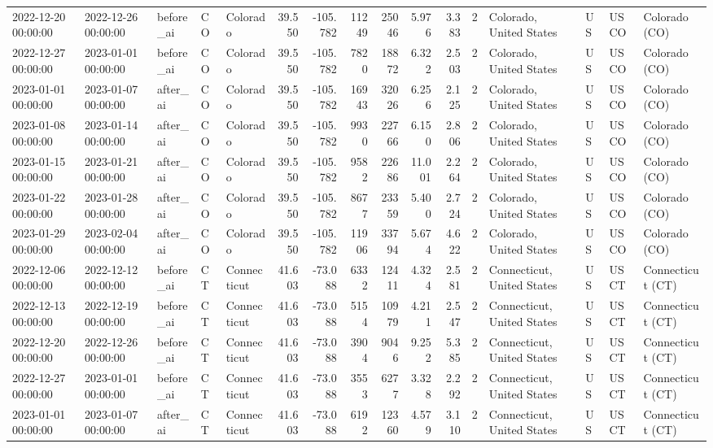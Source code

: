 \begin{tabular}{lllllrrrrrrlllll}
2022-12-20 00:00:00 & 2022-12-26 00:00:00 & before\_ai & CO & Colorado & 39.550 & -105.782 & 11249 & 25046 & 5.976 & 3.383 & 2 & Colorado, United States & US & USCO & Colorado (CO) \\
2022-12-27 00:00:00 & 2023-01-01 00:00:00 & before\_ai & CO & Colorado & 39.550 & -105.782 & 7820 & 18872 & 6.322 & 2.503 & 2 & Colorado, United States & US & USCO & Colorado (CO) \\
2023-01-01 00:00:00 & 2023-01-07 00:00:00 & after\_ai & CO & Colorado & 39.550 & -105.782 & 16943 & 32026 & 6.256 & 2.125 & 2 & Colorado, United States & US & USCO & Colorado (CO) \\
2023-01-08 00:00:00 & 2023-01-14 00:00:00 & after\_ai & CO & Colorado & 39.550 & -105.782 & 9930 & 22766 & 6.150 & 2.806 & 2 & Colorado, United States & US & USCO & Colorado (CO) \\
2023-01-15 00:00:00 & 2023-01-21 00:00:00 & after\_ai & CO & Colorado & 39.550 & -105.782 & 9582 & 22686 & 11.001 & 2.264 & 2 & Colorado, United States & US & USCO & Colorado (CO) \\
2023-01-22 00:00:00 & 2023-01-28 00:00:00 & after\_ai & CO & Colorado & 39.550 & -105.782 & 8677 & 23359 & 5.400 & 2.724 & 2 & Colorado, United States & US & USCO & Colorado (CO) \\
2023-01-29 00:00:00 & 2023-02-04 00:00:00 & after\_ai & CO & Colorado & 39.550 & -105.782 & 11906 & 33794 & 5.674 & 4.622 & 2 & Colorado, United States & US & USCO & Colorado (CO) \\
2022-12-06 00:00:00 & 2022-12-12 00:00:00 & before\_ai & CT & Connecticut & 41.603 & -73.088 & 6332 & 12411 & 4.324 & 2.581 & 2 & Connecticut, United States & US & USCT & Connecticut (CT) \\
2022-12-13 00:00:00 & 2022-12-19 00:00:00 & before\_ai & CT & Connecticut & 41.603 & -73.088 & 5154 & 10979 & 4.211 & 2.547 & 2 & Connecticut, United States & US & USCT & Connecticut (CT) \\
2022-12-20 00:00:00 & 2022-12-26 00:00:00 & before\_ai & CT & Connecticut & 41.603 & -73.088 & 3904 & 9046 & 9.252 & 5.385 & 2 & Connecticut, United States & US & USCT & Connecticut (CT) \\
2022-12-27 00:00:00 & 2023-01-01 00:00:00 & before\_ai & CT & Connecticut & 41.603 & -73.088 & 3553 & 6277 & 3.328 & 2.292 & 2 & Connecticut, United States & US & USCT & Connecticut (CT) \\
2023-01-01 00:00:00 & 2023-01-07 00:00:00 & after\_ai & CT & Connecticut & 41.603 & -73.088 & 6192 & 12360 & 4.579 & 3.110 & 2 & Connecticut, United States & US & USCT & Connecticut (CT) \\

\end{tabular}
